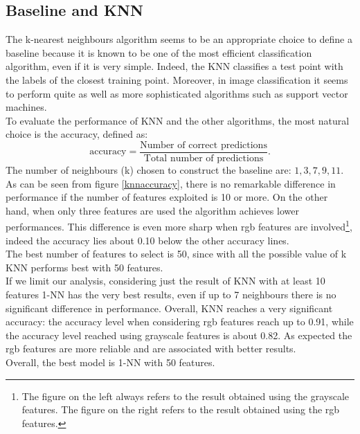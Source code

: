 \documentclass{article}
\begin{document}
\subsection{Baseline and KNN}
The k-nearest neighbours  algorithm seems to be an appropriate choice to define a baseline because it is known to be one of the most efficient classification algorithm, even if it is very simple. Indeed, the KNN classifies a test point with the labels of the closest training point. Moreover, in image classification it seems to perform quite as well as more sophisticated algorithms such as support vector machines. \cite{knnresults} \\
To evaluate the performance of KNN and the other algorithms, the most natural choice is the accuracy, defined as:
\begin{equation}
\text{accuracy}  = \frac{\text{Number of correct predictions}}{ \text{Total number of predictions}}.
\end{equation}
\noindent The number of neighbours (k) chosen to construct the baseline are: $1,3,7,9,11$.
As can be seen from figure \ref{knnaccuracy}, there is no remarkable difference in performance if the number of features exploited is 10 or more. On the other hand, when only three features are used the algorithm achieves lower performances. This difference is even more sharp when rgb features are involved\footnote{The figure on the left always refers to the result obtained using the grayscale features. The figure on the right refers to the result obtained using the rgb features.}, indeed the accuracy lies about 0.10 below the other accuracy lines.\\
The best number of features to select is 50, since with all the possible value of k KNN performs best with 50 features.\\
If we limit our analysis, considering just the result of KNN with at least 10 features 1-NN has the very best results, even if up to 7 neighbours there is no significant difference in performance.
Overall, KNN reaches a very significant accuracy: the accuracy level when considering rgb features reach up to 0.91, while the accuracy level reached using grayscale features is about 0.82. As expected the rgb features are more reliable and are associated with better results.\\
Overall, the best model is 1-NN with 50 features.
\end{document}
